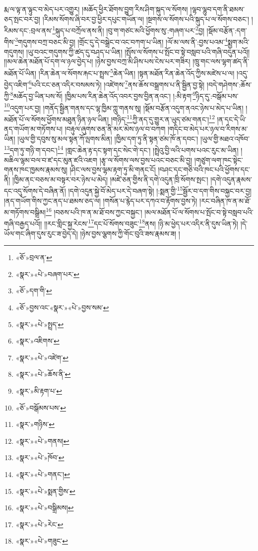 རྨ་ལ་ལྟ་ན་ལྟུང་བ་མེད་པར་འགྱུར། །མཆོད་ཕྱིར་ཐོགས་བྱུག་རིས་ཤིག་སྐུད་ལ་སོགས། །ལྷབ་ལྷུབ་དག་ནི་ཐམས་ཅད་སྤང་བར་བྱ། །རིམས་སོགས་ཞི་བར་བྱ་ཕྱིར་དཔུང་གཡོན་ལ། །སྔགས་ལ་སོགས་པའི་སྐུད་པ་ལ་སོགས་བཅང་། །རིམས་དང་:བྲལ་ནས་\footnote{«ཅོ་»བྲལ་ན་}སྐུད་པ་བཀྲོལ་ནས་ནི། །བུ་ག་གཙང་མའི་ཕྱོགས་སུ་:གཞག་པར་\footnote{«སྣར་»«པེ་»བཞག་པར་}བྱ། །སྡོམ་བརྩོན་:དག་གིས་\footnote{«ཅོ་»དག་གི་}གདུགས་བཀྲ་བཅང་མི་བྱ། །གྲོང་དུ་དེ་བསྒྲེང་བ་འང་བཀག་པ་ཡིན། །ལོ་མ་ལས་ནི་:བྱས་པའམ་\footnote{«ཅོ་»བྱས་འང་«སྣར་»«པེ་»བྱས་སམ་}སྨྱག་མའི་གདུགས། །ཡུ་བའང་གདུགས་ཀྱི་ཚད་དུ་བཤད་པ་ཡིན། །སྤོས་ལ་སོགས་པ་སྤོང་བ་སྟེ་བསླབ་པའི་གཞི་བདུན་པའོ།། །།མལ་ཆེན་མཐོན་པོ་དག་ལ་ཉལ་བྱེད་པ། །ཉེས་བྱས་བཀྲ་མི་ཤིས་པས་ངེས་པར་གཟིར། །ཁྲུ་གང་ལས་ལྷག་ཚད་ནི་མཐོན་པོ་ཡིན། །རིན་ཆེན་ལ་སོགས་རྐང་པ་སྤྲས་\footnote{«སྣར་»«པེ་»སྤྲད་}ཆེན་ཡིན། །སྟན་མཐོན་རིན་ཆེན་འོད་ཀྱིས་མཛེས་པ་ལ། །འདུ་བྱེད་འཇིག་\footnote{«སྣར་»འཇིགས་}པའི་ངང་ཅན་འདིར་བསམས་ཏེ། །འཛེགས་\footnote{«སྣར་»«པེ་»འཛེག་}ནས་ཆོས་བསྒྲགས་པ་ནི་སྦྱིན་བྱ་སྟེ། །བདེ་གཤེགས་:ཆོས་ཀྱི་\footnote{«སྣར་»«པེ་»ཆོས་ནི་}མཆོད་བྱ་ཡིན་པས་སོ། །ཁྱིམ་པས་རིན་ཆེན་འོད་འབར་བྱས་བྱིན་ནའང་། །:མི་རྟག་\footnote{«སྣར་»མི་རྟག་པ་}ཉིད་དུ་:བསྒོམ་པས་\footnote{«ཅོ་»བསྒོམས་པས་}འདུག་པར་བྱ། །གནོད་སྦྱིན་གནས་དང་ལྷ་ཁྱིམ་ཀླུ་གནས་སུ། །སྡོམ་བརྩོན་འདུག་ནའང་ཉེས་པ་མེད་པ་ཡིན། །མཐོན་པོ་ལ་སོགས་ཕྱོགས་མཐུན་ཉིན་ཉལ་ཡིན། །གཉིད་\footnote{«སྣར་»གཉིས་}ཀྱི་ནད་དུ་གྱུར་ན་ཡུད་ཙམ་གནང་།\footnote{«སྣར་»«པེ་»གནས།} །ན་དང་དེ་ཡི་ནད་གཡོག་མ་གཏོགས་པ། །བརྟུལ་ཞུགས་ཅན་ནི་མར་མེས་ཉལ་བ་བཀག །གདིང་བ་མེད་པར་ཉལ་བ་རིགས་མ་ཡིན། །ཡུལ་གྱི་དབུས་སུ་མལ་སྟན་ཀོ་ལྤགས་མིན། །ཁྱིམ་དག་ཏུ་ནི་སྟན་ཙམ་ཁོ་ན་དབང་། །ཡུལ་གྱི་མཐའ་འཁོབ་\footnote{«སྣར་»«པེ་»ཁོབ་}དག་ཏུ་གཉི་ག་དབང་།\footnote{«སྣར་»«པེ་»གནང་།} །གླང་ཆེན་རྟ་དང་སྟག་དང་སེང་གེ་དང་། །སྤྲེའུ་བྱི་ལའི་པགས་པའང་རུང་མ་ཡིན། །མཆིལ་ལྷམ་བལ་བ་ཛ་དང་མུན་ཛའི་འཇག །རྩྭ་ལ་སོགས་ལས་བྱས་པའང་བཅང་མི་བྱ། །གཙུག་ལག་ཁང་སྟེང་གནས་ཁང་ཁྱམས་རྣམས་སུ། །ཤིང་ལས་བྱས་ལྷམ་རྟག་ཏུ་མི་གནང་ངོ། །བཤང་དང་གཅི་བའི་ཁང་པའི་ཕྱོགས་དང་ནི། །ཁྱིམ་ནང་བཅས་མ་བསྟར་བར་ཉེས་པ་མེད། །མཛེ་ཅན་གྱིས་ནི་དགེ་འདུན་ཁྲི་སོགས་སྤང་། །དགེ་འདུན་རྣམས་དང་འདུ་སོགས་དེ་བཞིན་ནོ། །དགེ་འདུན་སྐྱེ་བོ་མེད་པར་དེ་བཞག་སྟེ། །:སྨན་གྱི་\footnote{«སྣར་»«པེ་»སྨན་གྱིས་}སྦྱོར་བ་དག་གིས་བསྐྱང་བར་བྱ། །ནད་གཡོག་གིས་ཀྱང་ནད་པ་ཐམས་ཅད་ལ། །གསོན་པ་རྙེད་པར་དཀའ་བ་རྟོགས་བྱས་ཏེ། །རང་བཞིན་ཁ་ན་མ་ཐོ་མ་གཏོགས་བསྒྲིམ།\footnote{«སྣར་»«པེ་»བསྒྲིམས།} །བཅས་པའི་ཁ་ན་མ་ཐོ་བས་ཀྱང་བསྐྱང་། །མལ་མཐོན་པོ་ལ་སོགས་པ་སྤོང་བ་སྟེ་བསླབ་པའི་གཞི་བརྒྱད་པའོ།། །།རང་གླིང་སྐྱ་རེངས་\footnote{«སྣར་»«པེ་»རེང་}དང་པོ་སོགས་བཟུང་\footnote{«སྣར་»«པེ་»གཟུང་}ནས། །ཉི་མ་ཕྱེད་པར་འདིར་ནི་དུས་ཡིན་ཏེ། །དེ་ཡོལ་གང་ཞིག་དུས་རུང་ཟ་བྱེད་དེ། །ཉེས་བྱས་ལྕགས་ཀྱི་གོང་བུའི་ཟས་རྣམས་ཟ། །
